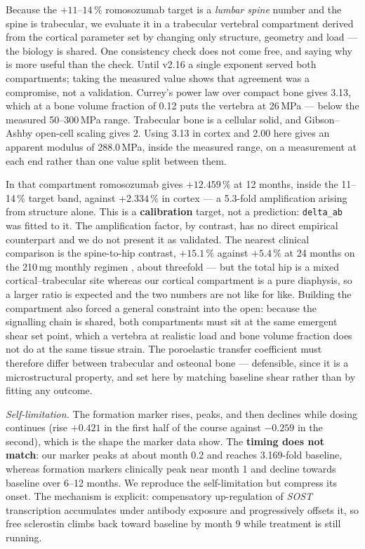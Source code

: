 \documentclass[10pt,letterpaper]{article}
\begin{document}
Because the $+11$--$14\,\%$ romosozumab target is a \emph{lumbar spine} number
\cite{cosman2016} and the spine is trabecular, we evaluate it in a trabecular
vertebral compartment derived from the cortical parameter set by changing only
structure, geometry and load --- the biology is shared. One consistency check does
not come free, and saying why is more useful than the check. Until v2.16 a
single exponent served both compartments; taking the measured value shows that
agreement was a compromise, not a validation. Currey's power law over compact
bone \cite{currey1988} gives 3.13, which at a bone volume fraction of 0.12 puts
the vertebra at 26\,MPa --- below the measured 50--300\,MPa range. Trabecular
bone is a cellular solid, and Gibson--Ashby open-cell scaling gives 2. Using
3.13 in cortex and 2.00 here gives an apparent modulus of 288.0\,MPa, inside
the measured range, on a measurement at each end rather than one value split
between them.

In that compartment romosozumab gives \textbf{$+12.459\,\%$} at 12 months,
inside the 11--14\,\% target band, against $+2.334\,\%$ in cortex --- a
5.3-fold amplification arising from structure alone. This is a
\textbf{calibration} target, not a prediction: \texttt{delta\_ab} was fitted to
it. The amplification factor, by contrast, has no direct empirical counterpart
and we do not present it as validated. The nearest clinical comparison is the
spine-to-hip contrast, $+15.1\,\%$ against $+5.4\,\%$ at 24 months on the
210\,mg monthly regimen \cite{mcclung2018}, about threefold --- but the total
hip is a mixed cortical--trabecular site whereas our cortical compartment is a
pure diaphysis, so a larger ratio is expected and the two numbers are not like
for like. Building the compartment also
forced a general constraint into the open: because the signalling chain is
shared, both compartments must sit at the same emergent shear set point, which
a vertebra at realistic load and bone volume fraction does not do at the same
tissue strain. The poroelastic transfer coefficient must therefore differ
between trabecular and osteonal bone --- defensible, since it is a
microstructural property, and set here by matching baseline shear rather than
by fitting any outcome.

\emph{Self-limitation.} The formation marker rises, peaks, and then declines
while dosing continues (rise $+0.421$ in the first half of the course against
$-0.259$ in the second), which is the shape the marker data show. The
\textbf{timing does not match}: our marker peaks at about month 0.2 and
reaches 3.169-fold baseline, whereas formation markers clinically peak near
month 1 and decline towards baseline over 6--12 months. We reproduce the
self-limitation but compress its onset. The mechanism is explicit: compensatory
up-regulation of \emph{SOST} transcription accumulates under antibody exposure
and progressively offsets it, so free sclerostin climbs back toward baseline
by month 9 while treatment is still running.
\end{document}
